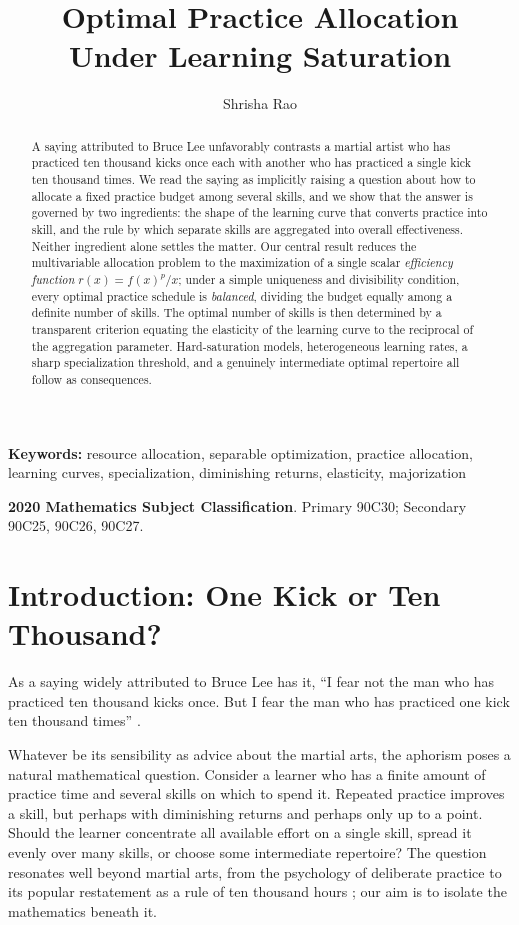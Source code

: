 \documentclass[11pt]{article}
\title{Optimal Practice Allocation\\
Under Learning Saturation}
\author{Shrisha Rao}
\date{}
\theoremstyle{definition}
\theoremstyle{remark}
\newcommand{\eff}{r}
\newenvironment{keywords}
  {\par\noindent\textbf{Keywords: }}
  {\par}
\begin{document}
\maketitle

\begin{abstract}
A saying attributed to Bruce Lee unfavorably contrasts a martial
artist who has practiced ten thousand kicks once each with another who
has practiced a single kick ten thousand times.  We read the saying as
implicitly raising a question about how to allocate a fixed practice
budget among several skills, and we show that the answer is governed
by two ingredients: the shape of the learning curve that converts
practice into skill, and the rule by which separate skills are
aggregated into overall effectiveness. Neither ingredient alone
settles the matter.  Our central result reduces the multivariable
allocation problem to the maximization of a single scalar
\emph{efficiency function} \(\eff(x)=f(x)^{p}/x\); under a simple
uniqueness and divisibility condition, every optimal practice schedule
is \emph{balanced}, dividing the budget equally among a definite
number of skills. The optimal number of skills is then determined by a
transparent criterion equating the elasticity of the learning curve to
the reciprocal of the aggregation parameter. Hard-saturation models,
heterogeneous learning rates, a sharp specialization threshold, and a
genuinely intermediate optimal repertoire all follow as consequences.
\end{abstract}

\begin{keywords}
resource allocation, separable optimization, practice allocation,
learning curves, specialization, diminishing returns, elasticity,
majorization
\end{keywords}

\noindent\textbf{2020 Mathematics Subject Classification}. Primary 90C30;
Secondary 90C25, 90C26, 90C27.

\section{Introduction: One Kick or Ten Thousand?}
\label{sec:intro}

As a saying widely attributed to Bruce Lee has it, ``I fear not the man who
has practiced ten thousand kicks once. But I fear the man who has practiced
one kick ten thousand times'' \citep[p.~109]{lee2020bewater}.

Whatever be its sensibility as advice about the martial arts, the
aphorism poses a natural mathematical question.  Consider a learner
who has a finite amount of practice time and several skills on which
to spend it.  Repeated practice improves a skill, but perhaps with
diminishing returns and perhaps only up to a point.  Should the
learner concentrate all available effort on a single skill, spread it
evenly over many skills, or choose some intermediate repertoire?  The
question resonates well beyond martial arts, from the psychology of
deliberate practice \citep{ericsson1993deliberate} to its popular
restatement as a rule of ten thousand hours
\citep{gladwell2008outliers}; our aim is to isolate the mathematics
beneath it.
\end{document}
